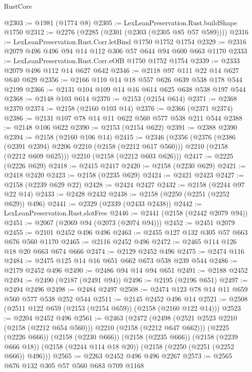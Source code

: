 \begin{lexlean}{RustCore}
\begin{coremodule}
@2303 := @1981 (@1774 @8)
@2305 := LexLeanPreservation.Rust.buildShape @1750
@2312 := @2276 (@2285 (@2301 (@2303 (@2305 @85 @57 @589))))
@2316 := LexLeanPreservation.Rust.Corr.letBind @1750 @1752 @1754
@2329 := @2316 @2079 @496 @496 @94 @14 @112 @306 @57 @644 @94 @600 @663 @1170
@2333 := LexLeanPreservation.Rust.Corr.eOfB @1750 @1752 @1754
@2339 := @2333 @2079 @496 @112 @14 @627 @642
@2346 := @2118 @97 @111 @22 @14 @627 @640 @629
@2356 := @2166 @110 @14 @18 @557 @626 @639 @538 @178 @544 @2199
@2366 := @2131 @104 @109 @14 @16 @614 @625 @638 @538 @197 @544
@2368 := @2148 @103 @614
@2370 := @2153 (@2154 @614)
@2371 := @2368 @2370
@2374 := @2158 (@2160 @103 @14)
@2376 := @2366 (@2371 @2374)
@2386 := @2131 @107 @78 @14 @11 @622 @560 @577 @538 @211 @544
@2388 := @2148 @106 @622
@2390 := @2153 (@2154 @622)
@2391 := @2388 @2390
@2394 := @2158 (@2160 @106 @14)
@2415 := @2346
    (@2356
      (@2376
        (@2386 (@2391 @2394) @2206 @2210 (@2158 (@2212 @617 @560)))
        @2210
        (@2158 (@2212 @609 @625)))
      @2210
      (@2158 (@2212 @603 @626)))
@2417 := @2225 (@2226 @629)
@2418 := @2415 @2417
@2420 := @2158 (@2230 @629)
@2421 := @2418 @2420
@2423 := @2158 (@2235 @629)
@2424 := @2421 @2423
@2427 := @2158 (@2239 @629 @22)
@2428 := @2424 @2427
@2432 := @2158 (@2244 @97 @22 @14)
@2433 := @2428 @2432
@2438 := @2158 (@2250 (@2251 (@2252 @629)) @496)
@2441 := @2329 (@2339 (@2433 @2438))
@2442 := LexLeanPreservation.Rust.slotFree
@2446 := @2441 (@2158 (@2442 @2079 @94))
@2451 := @2067 (@2069 @94 (@2073 (@2074 @94)))
@2452 := @2451 @2079
@2455 := @2101 @2452 @496 @496
@2463 := @2455 @127 @132 @305 @57 @663 @676 @560 @1170
@2465 := @2116 @2452 @496
@2472 := @2465 @114 @126 @18 @20 @663 @674 @666
@2474 := @2129 @2452 @496
@2475 := @2474 @116
@2484 := @2475 @125 @14 @16 @651 @662 @673 @538 @239 @544
@2486 := @2179 @2452 @496
@2490 := @2486 @94 @14 @94 @651
@2491 := @2188 @2452
@2494 := @2490 (@2187 (@2491 @94))
@2496 := @2195 (@2196 @651)
@2497 := @2494 @2496
@2498 := @2484 @2497
@2508 := @2474 @123 @78 @14 @11 @659 @560 @577 @538 @252 @544
@2511 := @2145 @2452 @496 @14
@2521 := @2508 (@2511 @122 @659 (@2153 (@2154 @659)) (@2158 (@2160 @122 @14)))
@2523 := @2204 @2452 @496
@2561 := @2463
    (@2472
      (@2498 (@2521 @2523 @2210 (@2158 (@2212 @654 @560))) @2210 (@2158 (@2212 @647 @662)))
      (@2225 (@2226 @666))
      (@2158 (@2230 @666))
      (@2158 (@2235 @666))
      (@2158 (@2239 @666 @18))
      (@2158 (@2244 @114 @18 @20))
      (@2158 (@2250 (@2251 (@2252 @666)) @496)))
@2565 := @2263 @2452 @496 @496 @2267
@2573 := @2565 @676 @132 @305 @57 @560 @683 @709 @1168

\end{coremodule}
\end{lexlean}
